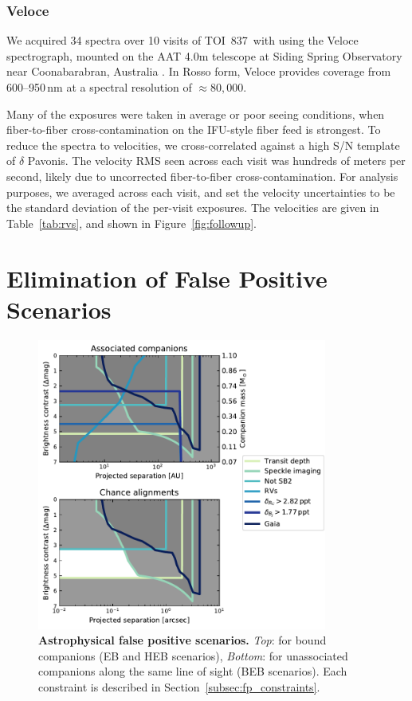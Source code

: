 \documentclass[12pt,twocolumn,tighten]{aastex63}
\newcommand{\tn}{TOI~837} %
\begin{document}
\subsubsection{Veloce}
We acquired 34 spectra over 10 visits of \tn\ with using the Veloce
spectrograph, mounted on the AAT 4.0m telescope at Siding Spring
Observatory near Coonabarabran, Australia \citep{gilbert_veloce_2018}.
In Rosso form, Veloce provides coverage from 600--950$\,$nm at a
spectral resolution of $\approx 80{,}000$.

Many of the exposures were taken in average or poor seeing conditions,
when fiber-to-fiber cross-contamination on the IFU-style fiber feed is
strongest.  To reduce the spectra to velocities, we cross-correlated
against a high S/N template of $\delta$ Pavonis.  The velocity RMS
seen across each visit was hundreds of meters per second, likely due to
uncorrected fiber-to-fiber cross-contamination.  For
analysis purposes, we averaged across each visit, and set the velocity
uncertainties to be the standard deviation of the per-visit exposures.
The velocities are given in Table~\ref{tab:rvs}, and shown in
Figure~\ref{fig:followup}.



\section{Elimination of False Positive Scenarios}
\label{sec:validation}

\begin{figure}[!t]
	\begin{center}
		\leavevmode
		\includegraphics[width=0.85\textwidth]{f4.pdf}
	\end{center}
	\vspace{-0.7cm}
	\caption{
		{\bf Astrophysical false positive scenarios.}
    {\it Top}: for bound companions (EB and HEB scenarios),
		{\it Bottom}: for unassociated companions along the same line of
    sight (BEB scenarios).
		Each constraint is described in Section~\ref{subsec:fp_constraints}.
		\label{fig:fpscenario}
	}
\end{figure}
\end{document}
